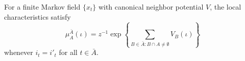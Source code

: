 For a finite Markov field $\{x_t\}$ with canonical neighbor potential $V$, the local characteristics satisfy
$$\mu_A^{\bar{A}}(\iota) = z^{-1} \exp\left\{ \sum_{B \in \bar{A}: B \cap A \neq \emptyset} V_B(\iota) \right\}$$
whenever $i_t = i'_t$ for all $t \in \bar{A}$.
